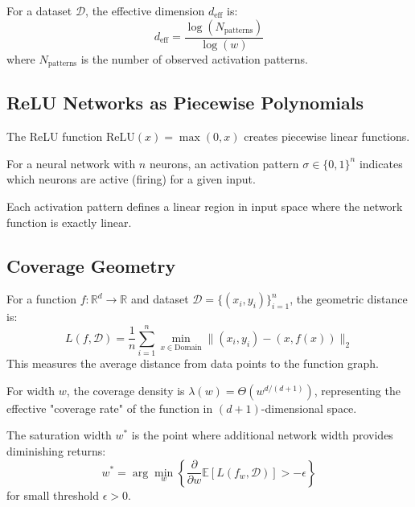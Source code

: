 \begin{definition}
For a dataset $\mathcal{D}$, the effective dimension $d_{\text{eff}}$ is:
$$d_{\text{eff}} = \frac{\log(N_{\text{patterns}})}{\log(w)}$$
where $N_{\text{patterns}}$ is the number of observed activation patterns.
\end{definition}

\subsection{ReLU Networks as Piecewise Polynomials}

\begin{definition}
The ReLU function $\text{ReLU}(x) = \max(0, x)$ creates piecewise linear functions.
\end{definition}

\begin{definition}
For a neural network with $n$ neurons, an activation pattern $\sigma \in \{0,1\}^n$ indicates which neurons are active (firing) for a given input.
\end{definition}

\begin{definition}
Each activation pattern defines a linear region in input space where the network function is exactly linear.
\end{definition}

\subsection{Coverage Geometry}

\begin{definition}
For a function $f: \mathbb{R}^d \to \mathbb{R}$ and dataset $\mathcal{D} = \{(x_i, y_i)\}_{i=1}^n$, the geometric distance is:
$$L(f, \mathcal{D}) = \frac{1}{n} \sum_{i=1}^n \min_{x \in \text{Domain}} \|(x_i, y_i) - (x, f(x))\|_2$$
This measures the average distance from data points to the function graph.
\end{definition}

\begin{definition}
For width $w$, the coverage density is $\lambda(w) = \Theta(w^{d/(d+1)})$, representing the effective "coverage rate" of the function in $(d+1)$-dimensional space.
\end{definition}

\begin{definition}
The saturation width $w^*$ is the point where additional network width provides diminishing returns:
$$w^* = \arg\min_w \left\{\frac{\partial}{\partial w} \mathbb{E}[L(f_w, \mathcal{D})] > -\epsilon\right\}$$
for small threshold $\epsilon > 0$.
\end{definition}

